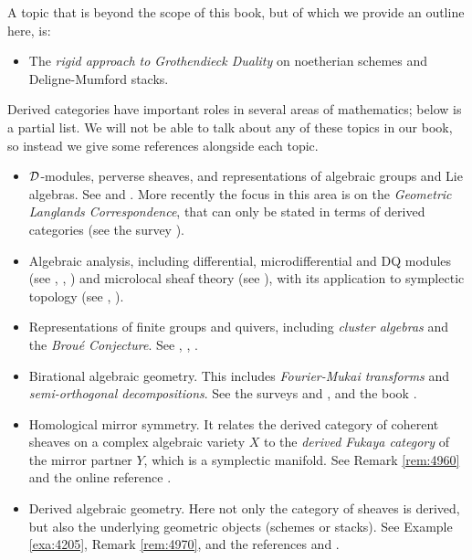 A topic that is beyond the scope of this book, but of which we 
provide an outline here, is:
\begin{itemize}
\item The {\em rigid approach to Grothendieck Duality} on 
noetherian schemes and Deligne-Mumford stacks. 
\end{itemize}

Derived categories have important roles in several areas of mathematics; below 
is a partial list. We will not be able to talk about any of these 
topics in our book, so instead we give some references alongside each 
topic. 
\begin{itemize}
\item[$\triangleright$] $\mathcal{D}$-modules, perverse sheaves, and 
representations of algebraic groups and Lie algebras.  
See \cite{BBD} and \cite{Bor}. 
More recently the focus in this area is on the {\em Geometric Langlands 
Correspondence}, that can only be stated in terms of derived categories (see 
the survey \cite{Gai}).

\item[$\triangleright$] 
Algebraic analysis, including differential, 
microdifferential and DQ modules (see \cite{Ka}, \cite{SKK}, \cite{KaSc3}) 
and microlocal sheaf theory (see \cite{KaSc1}), with its application to 
symplectic topology (see \cite{Ta}, \cite{NaZa}). 

\item[$\triangleright$] Representations of finite groups and quivers, 
including {\em cluster algebras} and the {\em Brou\'e Conjecture}. 
See \cite{Hap}, \cite{Kel2}, \cite{CrRo}. 

\item[$\triangleright$] Birational algebraic geometry. This includes {\em 
Fourier-Mukai transforms} and {\em semi-orthogonal decompositions}. 
See the surveys \cite{HiVdB} and \cite{MacSt}, and the book \cite{Huy}. 

\item[$\triangleright$] Homological mirror symmetry. It relates the derived 
category of coherent sheaves on a complex algebraic variety $X$ to the 
{\em derived Fukaya category} of the mirror partner $Y$, which is a symplectic 
manifold. See Remark \ref{rem:4960} and the online reference \cite{HMS}.  

\item[$\triangleright$] Derived algebraic geometry. Here not only the category 
of sheaves is derived, but also the underlying geometric objects (schemes or 
stacks). See Example \ref{exa:4205}, Remark \ref{rem:4970}, and the references 
\cite{Lur} and \cite{To2}.  
\end{itemize}


